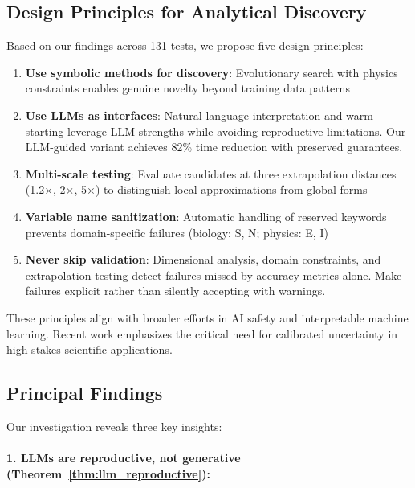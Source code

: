 \subsection{Design Principles for Analytical Discovery}

Based on our findings across 131 tests, we propose five design principles:

\begin{enumerate}
\item \textbf{Use symbolic methods for discovery}: Evolutionary search with physics constraints enables genuine novelty beyond training data patterns

\item \textbf{Use LLMs as interfaces}: Natural language interpretation and warm-starting leverage LLM strengths while avoiding reproductive limitations. Our LLM-guided variant achieves 82\% time reduction with preserved guarantees.

\item \textbf{Multi-scale testing}: Evaluate candidates at three extrapolation distances (1.2$\times$, 2$\times$, 5$\times$) to distinguish local approximations from global forms

\item \textbf{Variable name sanitization}: Automatic handling of reserved keywords prevents domain-specific failures (biology: S, N; physics: E, I)

\item \textbf{Never skip validation}: Dimensional analysis, domain constraints, and extrapolation testing detect failures missed by accuracy metrics alone. Make failures explicit rather than silently accepting with warnings.
\end{enumerate}

These principles align with broader efforts in AI safety and interpretable machine learning. Recent work emphasizes the critical need for calibrated uncertainty in high-stakes scientific applications.

\subsection{Principal Findings}

Our investigation reveals three key insights:

\paragraph{1. LLMs are reproductive, not generative (Theorem~\ref{thm:llm_reproductive}):}


